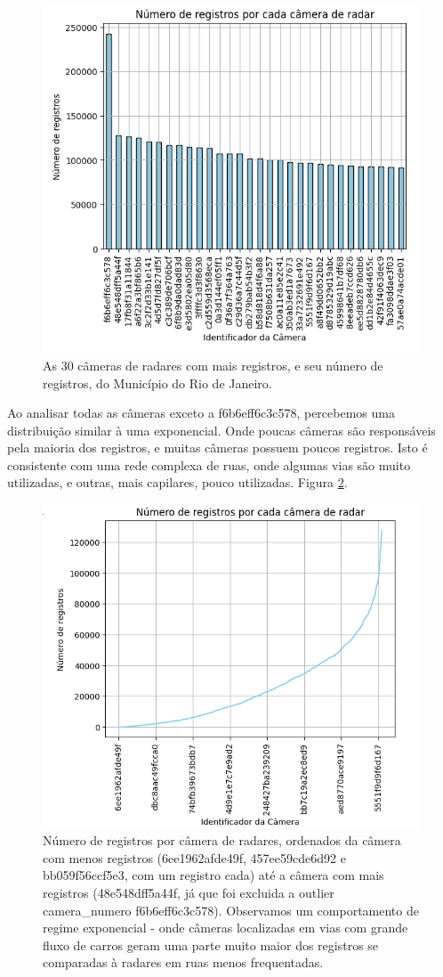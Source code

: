 \documentclass{article}
\begin{document}
\begin{figure}
    \centering
    \includegraphics[width=0.75\linewidth]{freqCameraNumeroTop30.png}
    \caption{As 30 câmeras de radares com mais registros, e seu número de registros, do Município do Rio de Janeiro.}
    \label{fig:freqCameraNumeroTop30}
\end{figure}

Ao analisar todas as câmeras exceto a f6b6eff6c3c578, percebemos uma distribuição similar à uma exponencial. Onde poucas câmeras são responsáveis pela maioria dos registros, e muitas câmeras possuem poucos registros. Isto é consistente com uma rede complexa de ruas, onde algumas vias são muito utilizadas, e outras, mais capilares, pouco utilizadas. Figura \ref{fig:lineCameraNumeroInverted}.

\begin{figure}
    \centering
    \includegraphics[width=0.75\linewidth]{lineCameraNumeroInverted.png}
    \caption{Número de registros por câmera de radares, ordenados da câmera com menos registros (6ee1962afde49f, 457ee59cde6d92 e bb059f56ccf5e3, com um registro cada) até a câmera com mais registros (48e548dff5a44f, já que foi excluida a outlier camera\_numero f6b6eff6c3c578). Observamos um comportamento de regime exponencial - onde câmeras localizadas em vias com grande fluxo de carros geram uma parte muito maior dos registros se comparadas à radares em ruas menos frequentadas.}
    \label{fig:lineCameraNumeroInverted}
\end{figure}
\end{document}
